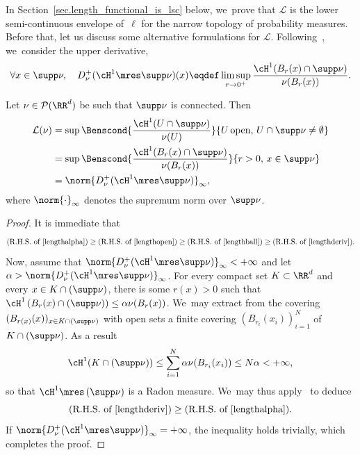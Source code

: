 In Section~\ref{sec.length_functional_is_lsc} below, we~prove that $\mathcal{L}$ is the lower semi-continuous envelope of~$\ell$ for the narrow topology of probability measures. Before that, let us discuss some alternative formulations for $\mathcal{L}$. Following~\cite[\S 2.4]{ambrosio2000functions}, we~consider the upper derivative,
\begin{equation}
\forall x \in \supp\nu,\quad D^+_\nu(\cH^1\mres \supp\nu)(x) \eqdef \limsup_{r\to 0^+} \frac{\cH^1(B_r(x)\cap \supp \nu)}{\nu(B_r(x))}.
\end{equation}

\begin{proposition}
Let $\nu \in \mathcal{P}(\RR^d)$ be such that $\supp \nu$ is connected. Then
\begin{align}
\mathcal{L}(\nu) &=\sup \Benscond{\frac{\cH^1(U \cap \supp \nu)}{\nu(U)}}{U \,\text{open},\, U\cap \supp \nu\neq \emptyset}\label{lengthopen}\\
&=\sup \Benscond{\frac{\cH^1(B_r(x)\cap \supp \nu)}{\nu(B_r(x))}}{r>0,\, x \in \supp \nu} \label{lengthball}\\
&= \norm{D^+_\nu(\cH^1\mres \supp\nu)}_{\infty},\label{lengthderiv}
\end{align}
where $\norm{\cdot}_\infty$ denotes the supremum norm over $\supp \nu$.
\end{proposition}

\begin{proof}
It is immediate that
\begin{equation*}
\left(\mbox{R.H.S. of \eqref{lengthalpha}}\right)\geq \left(\mbox{R.H.S. of \eqref{lengthopen}}\right)\geq \left(\mbox{R.H.S. of \eqref{lengthball}}\right)\geq(\mbox{R.H.S. of \eqref{lengthderiv}}).
\end{equation*}
Now, assume that $\norm{D^+_\nu(\cH^1\mres \supp\nu)}_{\infty}<+\infty$ and let $\alpha > \norm{D^+_\nu(\cH^1\mres \supp\nu)}_{\infty}$. For every compact set $K \subset \RR^d$ and every $x \in K\cap \left(\supp \nu\right)$, there is some $r(x)>0$ such that $\cH^1\left(B_r(x)\cap \left(\supp \nu\right)\right)\leq \alpha \nu(B_r(x))$. We~may extract from the covering $(B_{r(x)}(x))_{x \in K\cap \left(\supp\nu\right)}$ with open sets a finite covering $(B_{r_i}(x_i))_{i=1}^{N}$ of $K\cap \left(\supp \nu\right)$. As a result
\begin{equation*}
\cH^1(K\cap \left(\supp\nu\right))\leq \sum_{i=1}^{N} \alpha \nu(B_{r_i}(x_i))\leq N\alpha<+\infty,
\end{equation*}
so that $\cH^1\mres\left(\supp\nu\right)$ is a Radon measure. We~may thus apply~\cite[Prop.\,2.21]{ambrosio2000functions} to deduce
\begin{equation*}
\left(\mbox{R.H.S. of \eqref{lengthderiv}}\right)\geq(\mbox{R.H.S. of \eqref{lengthalpha}}).
\end{equation*}
If $\norm{D^+_\nu(\cH^1\mres \supp\nu)}_{\infty}=+\infty$, the inequality holds trivially, which completes the proof.
\end{proof}

